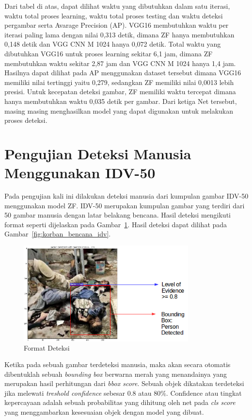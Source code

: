 Dari tabel di atas, dapat dilihat waktu yang dibutuhkan dalam satu iterasi, waktu total proses learning, waktu total proses testing dan waktu deteksi pergambar serta Avarage Precision (AP). VGG16 membutuhkan waktu per iterasi paling lama dengan nilai 0,313 detik, dimana ZF hanya membutuhkan 0,148 detik dan VGG CNN M 1024 hanya 0,072 detik. Total waktu yang dibutuhkan VGG16 untuk proses learning sekitar 6,1 jam, dimana ZF membutuhkan waktu sekitar 2,87 jam dan VGG CNN M 1024 hanya 1,4 jam. Hasilnya dapat dilihat pada AP menggunakan dataset tersebut dimana VGG16 memiliki nilai tertinggi yaitu 0,279, sedangkan ZF memiliki nilai 0,0013 lebih presisi. Untuk kecepatan deteksi gambar, ZF memiliki waktu tercepat dimana hanya membutuhkan waktu 0,035 detik per gambar. Dari ketiga Net tersebut, masing masing menghasilkan model yang dapat digunakan untuk melakukan proses deteksi.

\section{Pengujian Deteksi Manusia Menggunakan IDV-50}

Pada pengujian kali ini dilakukan deteksi manusia dari kumpulan gambar IDV-50 menggunakan model ZF. IDV-50 merupakan kumpulan gambar yang terdiri dari 50 gambar manusia dengan latar belakang bencana. Hasil deteksi mengikuti format seperti dijelaskan pada Gambar~\ref{fig:fotmat_deteksi}. Hasil deteksi dapat dilihat pada Gambar~\ref{fig:korban_bencana_idv}.

\begin{figure}[ht]
 \centering
 \includegraphics[width=0.8\textwidth]{format_deteksi}
 \caption{Format Deteksi}
 \label{fig:fotmat_deteksi}   
\end{figure}

Ketika pada sebuah gambar terdeteksi manusia, maka akan secara otomatis dibentuklah sebuah \textit{bounding box} berwarna merah yang menandainya yang merupakan hasil perhitungan dari \textit{bbox score}. Sebuah objek dikatakan terdeteksi jika melewati \textit{treshold confidence} sebesar 0.8 atau $80\%$. Confidence atau tingkat kepercayaan adalah sebuah probabilitas yang dihitung oleh net pada \textit{cls score} yang menggambarkan kesesuaian objek dengan model yang dibuat.


